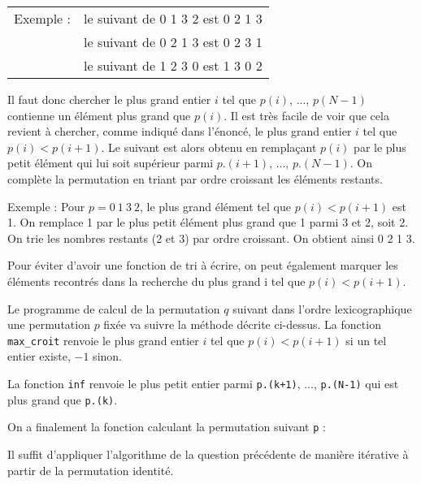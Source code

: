 \begin{tabular}{ l l }
    Exemple : & le suivant de 0 1 3 2 est 0 2 1 3 \\
     & le suivant de 0 2 1 3 est 0 2 3 1 \\
     & le suivant de 1 2 3 0 est 1 3 0 2
\end{tabular}
\medskip

Il faut donc chercher le plus grand entier $i$ tel que $p(i)$, ..., $p(N-1)$ contienne un élément plus grand que $p(i)$. Il est très facile de voir que cela revient à chercher, comme indiqué dans l'énoncé, le plus grand entier $i$ tel que $p(i)<p(i+1)$. Le suivant est alors obtenu en remplaçant $p(i)$ par le plus petit élément qui lui soit supérieur parmi $p.(i+1)$, ..., $p.(N-1)$. On complète la permutation en triant par ordre croissant les éléments restants.
\medskip

Exemple : Pour $p = 0~1~3~2$, le plus grand élément tel que $p(i)<p(i+1)$ est 1. On remplace 1 par le plus petit élément plus grand que 1 parmi 3 et 2, soit 2. On trie les nombres restants (2 et 3) par ordre croissant. On obtient ainsi 0 2 1 3.
\medskip

Pour éviter d'avoir une fonction de tri à écrire, on peut également marquer les éléments recontrés dans la recherche du plus grand i tel que $p(i)<p(i+1)$.
\medskip

Le programme de calcul de la permutation $q$ suivant dans l'ordre lexicographique une permutation $p$ fixée va suivre la méthode décrite ci-dessus. La fonction \texttt{max\_croit} renvoie le plus grand entier $i$ tel que $p(i)<p(i+1)$ si un tel entier existe, $-1$ sinon.



La fonction \texttt{inf} renvoie le plus petit entier parmi \texttt{p.(k+1)}, ..., \texttt{p.(N-1)} qui est plus grand que \texttt{p.(k)}.



On a finalement la fonction calculant la permutation suivant \texttt{p} :



\Q
Il suffit d'appliquer l'algorithme de la question précédente de manière itérative à partir de la permutation identité.



\Fin
